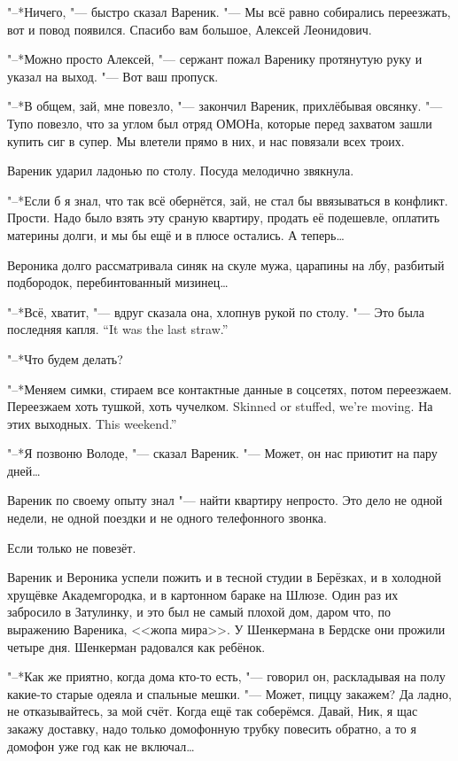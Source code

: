 "--*Ничего, "--- быстро сказал Вареник.
"--- Мы всё равно собирались переезжать, вот и повод появился.
Спасибо вам большое, Алексей Леонидович.

"--*Можно просто Алексей, "--- сержант пожал Варенику протянутую руку и указал на выход.
"--- Вот ваш пропуск.

\asterism

\textspace

"--*В общем, зай, мне повезло, "--- закончил Вареник, прихлёбывая овсянку.
"--- Тупо повезло, что за углом был отряд ОМОНа, которые перед захватом зашли купить сиг в супер.
Мы влетели прямо в них, и нас повязали всех троих.

Вареник ударил ладонью по столу.
Посуда мелодично звякнула.

"--*Если б я знал, что так всё обернётся, зай, не стал бы ввязываться в конфликт.
Прости.
Надо было взять эту сраную квартиру, продать её подешевле, оплатить материны долги, и мы бы ещё и в плюсе остались.
А теперь\ldots{}

Вероника долго рассматривала синяк на скуле мужа, царапины на лбу, разбитый подбородок, перебинтованный мизинец\ldots{}

"--*Всё, хватит, "--- вдруг сказала она, хлопнув рукой по столу.
{"--- Это была последняя капля.}
{``It was the last straw.''}

"--*Что будем делать?

"--*Меняем симки, стираем все контактные данные в соцсетях, потом переезжаем.
{Переезжаем хоть тушкой, хоть чучелком.}
{Skinned or stuffed, we're moving.}
{На этих выходных.}
{This weekend.''}

"--*Я позвоню Володе, "--- сказал Вареник.
"--- Может, он нас приютит на пару дней\ldots{}

\asterism

\label{Thu_2012_06_07}

Вареник по своему опыту знал "--- найти квартиру непросто.
Это дело не одной недели, не одной поездки и не одного телефонного звонка.

Если только не повезёт.

Вареник и Вероника успели пожить и в тесной студии в Берёзках, и в холодной хрущёвке Академгородка, и в картонном бараке на Шлюзе.
Один раз их забросило в Затулинку, и это был не самый плохой дом, даром что, по выражению Вареника, <<жопа мира>>.
У Шенкермана в Бердске они прожили четыре дня.
Шенкерман радовался как ребёнок.

"--*Как же приятно, когда дома кто-то есть, "--- говорил он, раскладывая на полу какие-то старые одеяла и спальные мешки.
"--- Может, пиццу закажем?
Да ладно, не отказывайтесь, за мой счёт.
Когда ещё так соберёмся.
Давай, Ник, я щас закажу доставку, надо только домофонную трубку повесить обратно, а то я домофон уже год как не включал\ldots{}

